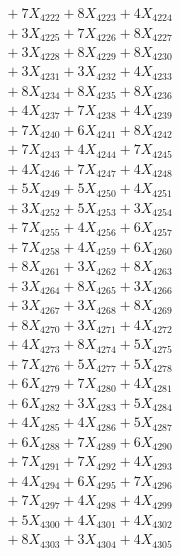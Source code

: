 \documentclass[a4paper,10pt]{article}
\begin{document}
{\begin{align}
&\;  + 7 X_{4222} + 8 X_{4223} + 4 X_{4224} \\[0.3ex]
&\;  + 3 X_{4225} + 7 X_{4226} + 8 X_{4227} \\[0.3ex]
&\;  + 3 X_{4228} + 8 X_{4229} + 8 X_{4230} \\[0.3ex]
&\;  + 3 X_{4231} + 3 X_{4232} + 4 X_{4233} \\[0.3ex]
&\;  + 8 X_{4234} + 8 X_{4235} + 8 X_{4236} \\[0.3ex]
&\;  + 4 X_{4237} + 7 X_{4238} + 4 X_{4239} \\[0.5ex]\allowbreak
&\;  + 7 X_{4240} + 6 X_{4241} + 8 X_{4242} \\[0.3ex]
&\;  + 7 X_{4243} + 4 X_{4244} + 7 X_{4245} \\[0.3ex]
&\;  + 4 X_{4246} + 7 X_{4247} + 4 X_{4248} \\[0.3ex]
&\;  + 5 X_{4249} + 5 X_{4250} + 4 X_{4251} \\[0.3ex]
&\;  + 3 X_{4252} + 5 X_{4253} + 3 X_{4254} \\[0.3ex]
&\;  + 7 X_{4255} + 4 X_{4256} + 6 X_{4257} \\[0.3ex]
&\;  + 7 X_{4258} + 4 X_{4259} + 6 X_{4260} \\[0.3ex]
&\;  + 8 X_{4261} + 3 X_{4262} + 8 X_{4263} \\[0.3ex]
&\;  + 3 X_{4264} + 8 X_{4265} + 3 X_{4266} \\[0.3ex]
&\;  + 3 X_{4267} + 3 X_{4268} + 8 X_{4269} \\[0.5ex]\allowbreak
&\;  + 8 X_{4270} + 3 X_{4271} + 4 X_{4272} \\[0.3ex]
&\;  + 4 X_{4273} + 8 X_{4274} + 5 X_{4275} \\[0.3ex]
&\;  + 7 X_{4276} + 5 X_{4277} + 5 X_{4278} \\[0.3ex]
&\;  + 6 X_{4279} + 7 X_{4280} + 4 X_{4281} \\[0.3ex]
&\;  + 6 X_{4282} + 3 X_{4283} + 5 X_{4284} \\[0.3ex]
&\;  + 4 X_{4285} + 4 X_{4286} + 5 X_{4287} \\[0.3ex]
&\;  + 6 X_{4288} + 7 X_{4289} + 6 X_{4290} \\[0.3ex]
&\;  + 7 X_{4291} + 7 X_{4292} + 4 X_{4293} \\[0.3ex]
&\;  + 4 X_{4294} + 6 X_{4295} + 7 X_{4296} \\[0.3ex]
&\;  + 7 X_{4297} + 4 X_{4298} + 4 X_{4299} \\[0.5ex]\allowbreak
&\;  + 5 X_{4300} + 4 X_{4301} + 4 X_{4302} \\[0.3ex]
&\;  + 8 X_{4303} + 3 X_{4304} + 4 X_{4305} \\[0.3ex]

\end{align}}
\end{document}
